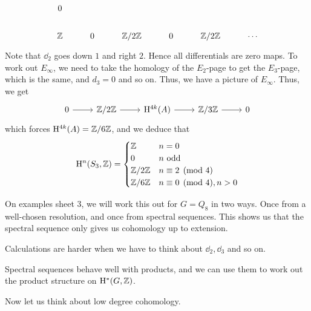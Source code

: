 \documentclass{article}
\begin{document}
\begin{example}
\[\begin{tikzcd}
        0 \\
        \Z & 0 & {\Z/2\Z} & 0 & {\Z/2\Z} & \cdots
    \end{tikzcd}\]
    Note that \(\dd_2\) goes down \(1\) and right \(2\). Hence all differentials are zero maps. To work out \(E_\infty\), we need to take the homology of the \(E_2\)-page to get the \(E_3\)-page, which is the same, and \(d_3 = 0\) and so on. Thus, we have a picture of \(E_\infty\). Thus, we get
    \[\begin{tikzcd}
        0 & {\Z/2\Z} & {\HH^{4k}(A)} & {\Z/3\Z} & 0
        \arrow[from=1-1, to=1-2]
        \arrow[from=1-2, to=1-3]
        \arrow[from=1-3, to=1-4]
        \arrow[from=1-4, to=1-5]
    \end{tikzcd}\]
    which forces \(\mathrm{H}^{4k}(A) = \mathbb{Z}/6\mathbb{Z}\), and we deduce that
    \[\mathrm{H}^n(S_3, \mathbb{Z}) = \begin{cases}
        \mathbb{Z} & n = 0 \\
        0 & n \text{ odd} \\
        \mathbb{Z}/2\mathbb{Z} & n \equiv 2 \pmod 4 \\
        \mathbb{Z}/6\mathbb{Z} & n \equiv 0 \pmod 4, n > 0
    \end{cases}\]
\end{example}

\begin{remark}
    On examples sheet 3, we will work this out for \(G = Q_8\) in two ways. Once from a well-chosen resolution, and once from spectral sequences. This shows us that the spectral sequence only gives us cohomology up to extension.
\end{remark}

\begin{remark}
    Calculations are harder when we have to think about \(\dd_2, \dd_3\) and so on.
\end{remark}

\begin{remark}
    Spectral sequences behave well with products, and we can use them to work out the product structure on \(\mathrm{H}^*(G, \mathbb{Z})\).
\end{remark}

Now let us think about low degree cohomology.
\end{document}
